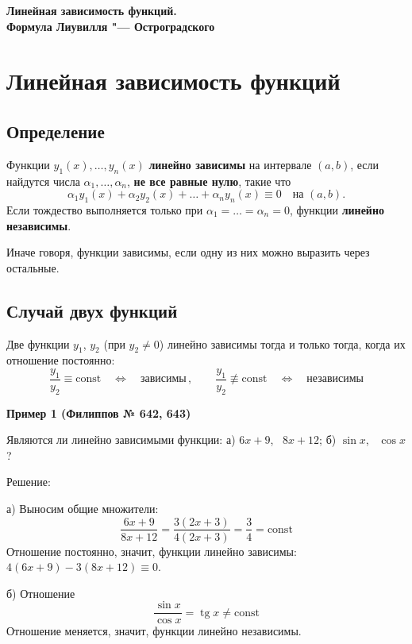 \documentclass[11pt,a4paper]{article}
\newcommand{\example}[1]{\par\medskip\noindent\textbf{#1}\par\nopagebreak\smallskip}
\begin{document}
\begin{center}
{\Large\bfseries Линейная зависимость функций. \\[2pt]  Формула Лиувилля "--- Остроградского}
\end{center}

\section*{Линейная зависимость функций}

\subsection*{Определение}

Функции $y_1(x), \dots, y_n(x)$ \textbf{линейно зависимы} на интервале $(a, b)$, если найдутся числа $\alpha_1, \dots, \alpha_n$, \textbf{не все равные нулю}, такие что
\[
  \alpha_1 y_1(x) + \alpha_2 y_2(x) + \dots + \alpha_n y_n(x) \equiv 0 \quad \text{на } (a, b).
\]
Если тождество выполняется только при $\alpha_1 = \dots = \alpha_n = 0$, функции \textbf{линейно независимы}.

Иначе говоря, функции зависимы, если одну из них можно выразить через остальные.

\subsection*{Случай двух функций}

Две функции $y_1$, $y_2$ (при $y_2 \ne 0$) линейно зависимы тогда и только тогда, когда их отношение постоянно:
\[
  \frac{y_1}{y_2} \equiv \text{const}
  \quad\Leftrightarrow\quad
  \text{зависимы}\,, \qquad
  \frac{y_1}{y_2} \not\equiv \text{const}
  \quad\Leftrightarrow\quad
  \text{независимы}
\]

\example{Пример 1 (Филиппов № 642, 643)}

Являются ли линейно зависимыми функции:
\quad а) $6x + 9$, \ $8x + 12$; \qquad б) $\sin x$, \ $\cos x$?

Решение:

а) Выносим общие множители:
\[
  \frac{6x + 9}{8x + 12} = \frac{3(2x + 3)}{4(2x + 3)} = \frac34 = \text{const}
\]
Отношение постоянно, значит, функции линейно зависимы: $4(6x + 9) - 3(8x + 12) \equiv 0$.

б) Отношение
\[
  \frac{\sin x}{\cos x} = \operatorname{tg} x \ne \text{const}
\]
Отношение меняется, значит, функции линейно независимы.
\end{document}
